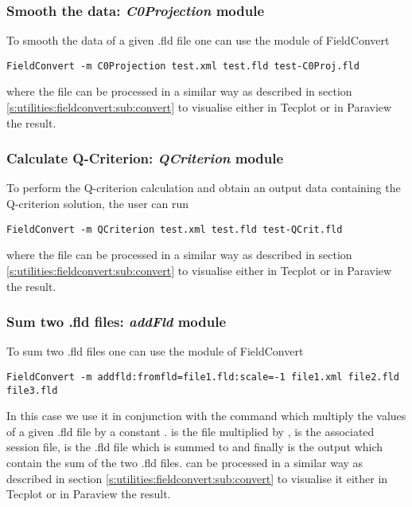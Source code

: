\subsubsection{Smooth the data: \textit{C0Projection} module}
To smooth the data of a given .fld file one can 
use the  module of FieldConvert
%
\begin{lstlisting}[style=BashInputStyle]
FieldConvert -m C0Projection test.xml test.fld test-C0Proj.fld
\end{lstlisting}
%
where the file  can be processed in a similar 
way as described in section \ref{s:utilities:fieldconvert:sub:convert}
to visualise either in Tecplot or in Paraview the result.

\subsubsection{Calculate Q-Criterion: \textit{QCriterion} module}
To perform the Q-criterion calculation and obtain an output 
data containing the Q-criterion solution, the user can run
%
\begin{lstlisting}[style=BashInputStyle]
FieldConvert -m QCriterion test.xml test.fld test-QCrit.fld
\end{lstlisting}
%
where the file  can be processed in a similar 
way as described in section \ref{s:utilities:fieldconvert:sub:convert}
to visualise either in Tecplot or in Paraview the result.
%
%
%

\subsubsection{Sum two .fld files: \textit{addFld} module}
To sum two .fld files one can use the  module of FieldConvert
%
\begin{lstlisting}[style=BashInputStyle]
FieldConvert -m addfld:fromfld=file1.fld:scale=-1 file1.xml file2.fld file3.fld
\end{lstlisting}
%
In this case we use it in conjunction with the command  
which multiply the values of a given .fld file by a constant . 
 is the file multiplied by ,  
is the associated session file,  is the .fld file which 
is summed to  and finally  is the output 
which contain the sum of the two .fld files.
 can be processed in a similar way as described 
in section \ref{s:utilities:fieldconvert:sub:convert} to visualise 
it either in Tecplot or in Paraview the result.
%
%
%
